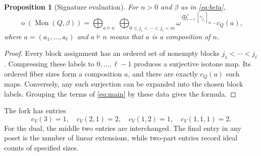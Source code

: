 \documentclass[11pt,a4paper]{article}
\newtheorem{proposition}[proposition]{Proposition}
\theoremstyle{definition}
\theoremstyle{remark}
\newcommand{\Mon}{\operatorname{Mon}}
\newcommand{\otype}{\operatorname{o}}
\newcommand{\Nrep}[2]{\left[#1\right]_{#2}}
\begin{document}
\begin{proposition}[Signature evaluation]\label{prop:signatureeval}
For $n>0$ and $\beta$ as in \eqref{eq:beta},
\begin{equation}\label{eq:signatureeval}
 \otype(\Mon(Q,\beta))
 =\bigoplus_{a\vDash n}\ 
   \bigoplus_{0\leq j_1<\cdots<j_\ell<m}
   \omega^{\bigoplus_{r=1}^{\ell}\Nrep{\gamma_{j_r}}{a_r}}
       \cdot c_Q(a),
\end{equation}
where $a=(a_1,\ldots,a_\ell)$ and $a\vDash n$ means that $a$ is a
composition of $n$.
\end{proposition}
\begin{proof}
Every block assignment has an ordered set of nonempty blocks
$j_1<\cdots<j_\ell$. Compressing these labels to $0,\ldots,\ell-1$
produces a surjective isotone map. Its ordered fiber sizes form a
composition $a$, and there are exactly $c_Q(a)$ such maps. Conversely,
any such surjection can be expanded into the chosen block labels. Grouping
the terms of \eqref{eq:main} by these data gives the formula.
\end{proof}

The fork has entries
\[
 c_V(3)=1,\quad c_V(2,1)=2,\quad c_V(1,2)=1,
 \quad c_V(1,1,1)=2.
\]
For the dual, the middle two entries are interchanged. The final entry in
any poset is the number of linear extensions, while two-part entries
record ideal counts of specified sizes.
\end{document}
